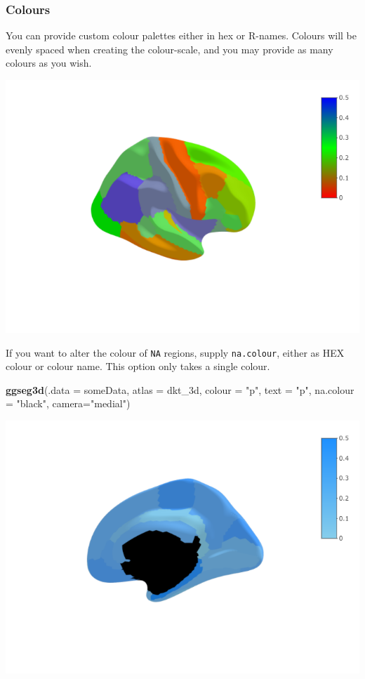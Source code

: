 \documentclass[fleqn,10pt]{wlpeerj} %
\newenvironment{Shaded}{\begin{snugshade}}{\end{snugshade}}
\newcommand{\DataTypeTok}[1]{\textcolor[rgb]{0.13,0.29,0.53}{#1}}
\newcommand{\KeywordTok}[1]{\textcolor[rgb]{0.13,0.29,0.53}{\textbf{#1}}}
\newcommand{\NormalTok}[1]{#1}
\newcommand{\StringTok}[1]{\textcolor[rgb]{0.31,0.60,0.02}{#1}}
\begin{document}
\hypertarget{colours}{%
\subsubsection{Colours}\label{colours}}

You can provide custom colour palettes either in hex or R-names.
Colours will be evenly spaced when creating the colour-scale, and you may provide as many colours as you wish.

\begin{Shaded}
\end{Shaded}

\includegraphics[width=0.4\linewidth]{png/ggseg3d_colour}

If you want to alter the colour of \texttt{NA} regions, supply \texttt{na.colour}, either as HEX colour or colour name.
This option only takes a single colour.

\begin{Shaded}
\begin{Highlighting}[]
  \KeywordTok{ggseg3d}\NormalTok{(}\DataTypeTok{.data =}\NormalTok{ someData, }\DataTypeTok{atlas =}\NormalTok{ dkt_3d,}
          \DataTypeTok{colour =} \StringTok{"p"}\NormalTok{, }\DataTypeTok{text =} \StringTok{"p"}\NormalTok{,}
          \DataTypeTok{na.colour =} \StringTok{"black"}\NormalTok{, }\DataTypeTok{camera=}\StringTok{"medial"}\NormalTok{)}
\end{Highlighting}
\end{Shaded}

\includegraphics[width=0.4\linewidth]{png/ggseg3d_nacolour}
\end{document}
